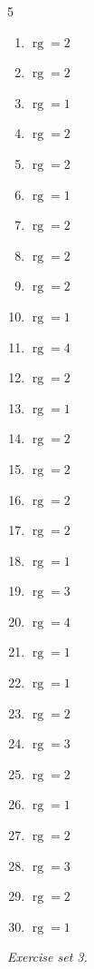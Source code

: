 \begin{multicols}{5}\raggedright
\begin{enumerate}[label=\arabic*., leftmargin=*, itemsep=1pt]
\item $\operatorname{rg}=2$
\item $\operatorname{rg}=2$
\item $\operatorname{rg}=1$
\item $\operatorname{rg}=2$
\item $\operatorname{rg}=2$
\item $\operatorname{rg}=1$
\item $\operatorname{rg}=2$
\item $\operatorname{rg}=2$
\item $\operatorname{rg}=2$
\item $\operatorname{rg}=1$
\item $\operatorname{rg}=4$
\item $\operatorname{rg}=2$
\item $\operatorname{rg}=1$
\item $\operatorname{rg}=2$
\item $\operatorname{rg}=2$
\item $\operatorname{rg}=2$
\item $\operatorname{rg}=2$
\item $\operatorname{rg}=1$
\item $\operatorname{rg}=3$
\item $\operatorname{rg}=4$
\item $\operatorname{rg}=1$
\item $\operatorname{rg}=1$
\item $\operatorname{rg}=2$
\item $\operatorname{rg}=3$
\item $\operatorname{rg}=2$
\item $\operatorname{rg}=1$
\item $\operatorname{rg}=2$
\item $\operatorname{rg}=3$
\item $\operatorname{rg}=2$
\item $\operatorname{rg}=1$
\end{enumerate}
\end{multicols}
\par\noindent\emph{Exercise set 3.}\nopagebreak
